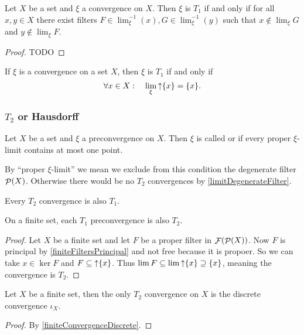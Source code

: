 \begin{lemma}
Let $X$ be a set and $\xi$ a convergence on $X$. Then $\xi$ is $T_1$ \textup{if and only if} for all $x,y \in X$ there exist filters $F \in \lim^{-1}_\xi(x), G \in \lim^{-1}_\xi(y)$ such that $x\notin \lim_\xi G$ and $y\notin \lim_\xi F$.
\end{lemma}
\begin{proof}
TODO
\end{proof}

\begin{lemma} \label{convergenceOneElementPrincipals}
If $\xi$ is a convergence on a set $X$, then $\xi$ is $T_1$ \textup{if and only if}
\[ \forall x\in X: \quad \lim_\xi\mathop{\uparrow}\{x\} = \{x\}. \]
\end{lemma}

\subsubsection{$T_2$ or Hausdorff}
\begin{definition}
Let $X$ be a set and $\xi$ a preconvergence on $X$. Then $\xi$ is called  or  if every proper $\xi$-limit contains at most one point.
\end{definition}
By ``proper $\xi$-limit'' we mean we exclude from this condition the degenerate filter $\mathop{\mathcal{P}}(X)$. Otherwise there would be no $T_2$ convergences by \ref{limitDegenerateFilter}.

\begin{lemma}
Every $T_2$ convergence is also $T_1$.
\end{lemma}

\begin{proposition}
On a finite set, each $T_1$ preconvergence is also $T_2$.
\end{proposition}
\begin{proof}
Let $X$ be a finite set and let $F$ be a proper filter in $\mathop{\mathcal{F}}(\mathop{\mathcal{P}}(X))$. Now $F$ is principal by \ref{finiteFiltersPrincipal} and not free because it is propoer. So we can take $x\in \ker F$ and $F \subseteq \mathop{\uparrow}\{x\}$. Thus $\lim F \subseteq \lim \mathop{\uparrow}\{x\} \supseteq \{x\}$, meaning the convergence is $T_2$.
\end{proof}
\begin{corollary}
Let $X$ be a finite set, then the only $T_2$ convergence on $X$ is the discrete convergence $\iota_X$.
\end{corollary}
\begin{proof}
By \ref{finiteConvergenceDiscrete}.
\end{proof}

